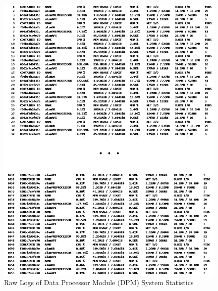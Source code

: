 \begin{figure}[ht]
    \centering
    \includegraphics[height=0.80\textheight]{./assets/Appendices/B/RawTestsData/RawLogs/DPMStats.png}
    \caption{Raw Logs of Data Processor Module (DPM) System Statistics}
    \label{fig:DPMStats}
\end{figure}
\FloatBarrier

